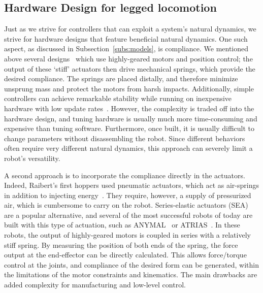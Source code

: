 \par

\subsection{Hardware Design for legged locomotion}

Just as we strive for controllers that can exploit a system's natural dynamics, we strive for hardware designs that feature beneficial natural dynamics.
One such aspect, as discussed in Subsection~\ref{subs:models}, is compliance.
We mentioned above several designs~\cite{sprowitz2013towards,buchli2006resonance,altendorfer2001rhex,owaki2013simple} which use highly-geared motors and position control; the output of these `stiff' actuators then drive mechanical springs, which provide the desired compliance. The springs are placed distally, and therefore minimize unsprung mass and protect the motors from harsh impacts. Additionally, simple controllers can achieve remarkable stability while running on inexpensive hardware with low update rates~\cite{sprowitz2018oncilla}. However, the complexity is traded off into the hardware design, and tuning hardware is usually much more time-consuming and expensive than tuning software. Furthermore, once built, it is usually difficult to change parameters without disassembling the robot. Since different behaviors often require very different natural dynamics, this approach can severely limit a robot's versatility. \par
A second approach is to incorporate the compliance directly in the actuators. Indeed, Raibert's first hoppers used pneumatic actuators, which act as air-springs in addition to injecting energy~\cite{raibert1986legged}. They require, however, a supply of pressurized air, which is cumbersome to carry on the robot. %
Series-elastic actuators (SEA)~\cite{pratt1995series} are a popular alternative, and several of the most successful robots of today are built with this type of actuation, such as ANYMAL~\cite{hutter2016anymal} or ATRIAS~\cite{hubicki2016atrias}.
In these robots, the output of highly-geared motors is coupled in series with a relatively stiff spring. By measuring the position of both ends of the spring, the force output at the end-effector can be directly calculated. This allows force/torque control at the joints, and compliance of the desired form can be generated, within the limitations of the motor constraints and kinematics. The main drawbacks are added complexity for manufacturing and low-level control.
\par
